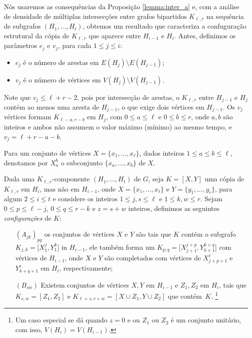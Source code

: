 \documentclass[11pt,twoside,a4paper]{book}
\newcommand{\K}{K_{\ell,r}} %
\theoremstyle{note}
\begin{document}
      Nós usaremos as consequências da Proposição \ref{lemma:inter_a} e, com a análise de densidade de múltiplas intersecções entre grafos bipartidos $\K$ na sequência de subgrafos $(H_1, \ldots, H_t)$, obtemos um resultado que caracteriza a confuguração estrutural da cópia de $\K$ que aparece entre $H_{i-1}$ e $H_i$.
     Antes, definimos os parâmetros $e_j$ e $v_j$, para cada $1 \leq j \leq i$:
     \begin{itemize}
         \item $e_j$ é o número de arestas em $E(H_{j}) \setminus E(H_{j-1})$;
         \item $v_j$ é o número de vértices em $V(H_{j}) \setminus V(H_{j-1})$. 
     \end{itemize}
     
     Note que $v_j \leq \ell+r-2$, pois por intersecção de arestas, o $\K$ entre $H_{j-1}$ e $H_{j}$ contém ao menos uma aresta de $H_{j-1}$, o que exige dois vértices em $H_{j-1}$. 
     Os $v_{j}$ vértices formam $K_{\ell-a,r-b}$ em $H_{j}$, com $0 \leq a\leq \ell$ e $0\leq b\leq r$, onde $a,b$ são inteiros e ambos não assumem o valor máximo (mínimo) ao mesmo tempo, e $v_{j} = \ell+r-a-b$.
 

  Para um conjunto de vértices $X = \{x_1, \ldots, x_\ell\}$, dados inteiros $1 \leq a \leq b \leq \ell$, denotamos por $X_a^b$ o subconjunto $\{x_a, \ldots, x_b\}$ de $X$. 

    Dada uma $\K$-componente $(H_1, \ldots, H_t)$ de $G$, 
    seja $K = [X, Y]$ uma cópia de $\K$ em $H_i$, mas não em $H_{i-1}$, 
    onde $X = \{x_1, \ldots, x_\ell\}$ e $Y=\{y_1, \ldots, y_r\}$, para algum $2\leq i\leq t$
    e considere os inteiros $1 \leq j, s \leq \ell$ e $1 \leq k,w \leq r$.  
    Sejam $0 \leq p \leq \ell-j$, $0\leq q \leq r -k$ e $z = s+w$ inteiros, 
     definimos as seguintes \emph{configurações} de $K$: 
       \begin{enumerate}
       \item[$(A_{jk})_{pq}$]\label{configA} 
        os conjuntos de vértices $X$ e $Y$ são tais que $K$
    contém o subgrafo
    $K_{j,k} = \big[X_1^j, Y_1^k\big]$ in $H_{i-1}$, 
    ele também forma um 
    $K_{p,q} = \big[X_{j+1}^{j+p}, Y_{k+1}^{k+q}\big]$
    com  vértices de $H_{i-1}$, onde $X$ e $Y$ são completados com vértices de
    $X_{j+p+1}^\ell$ e $Y_{k+q+1}^r$ em $H_i$, respectivamente;
                
       \item[$(B_{sw})$]\label{configB} 
        Existem conjuntos de vértices $X,Y$ em $H_{i-1}$ e $Z_1, Z_2$ em $H_i$, tais que
      $K_{s,w} = [Z_1, Z_2]$ e 
      $K_{\ell+s,r+w}= [X\cup Z_1, Y\cup Z_2]$ que contém~$K$.
      \footnote[1]{Um caso especial se dá quando $z = 0$ e 
     ou $Z_1$ ou $Z_2$ é um conjunto unitário, com isso, $V(H_i) = V(H_{i-1})$.}
       \end{enumerate}
\end{document}
